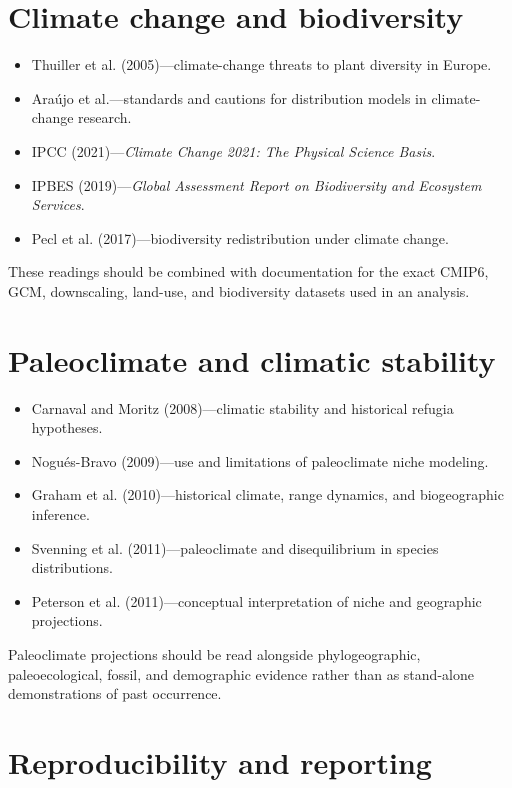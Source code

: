 \section{Climate change and biodiversity}

\begin{itemize}
\item Thuiller et al. (2005)---climate-change threats to plant diversity in Europe.
\item Araújo et al.---standards and cautions for distribution models in climate-change research.
\item IPCC (2021)---\textit{Climate Change 2021: The Physical Science Basis}.
\item IPBES (2019)---\textit{Global Assessment Report on Biodiversity and Ecosystem Services}.
\item Pecl et al. (2017)---biodiversity redistribution under climate change.
\end{itemize}

These readings should be combined with documentation for the exact CMIP6, GCM, downscaling, land-use, and biodiversity datasets used in an analysis.

\section{Paleoclimate and climatic stability}

\begin{itemize}
\item Carnaval and Moritz (2008)---climatic stability and historical refugia hypotheses.
\item Nogués-Bravo (2009)---use and limitations of paleoclimate niche modeling.
\item Graham et al. (2010)---historical climate, range dynamics, and biogeographic inference.
\item Svenning et al. (2011)---paleoclimate and disequilibrium in species distributions.
\item Peterson et al. (2011)---conceptual interpretation of niche and geographic projections.
\end{itemize}

Paleoclimate projections should be read alongside phylogeographic, paleoecological, fossil, and demographic evidence rather than as stand-alone demonstrations of past occurrence.

\section{Reproducibility and reporting}

